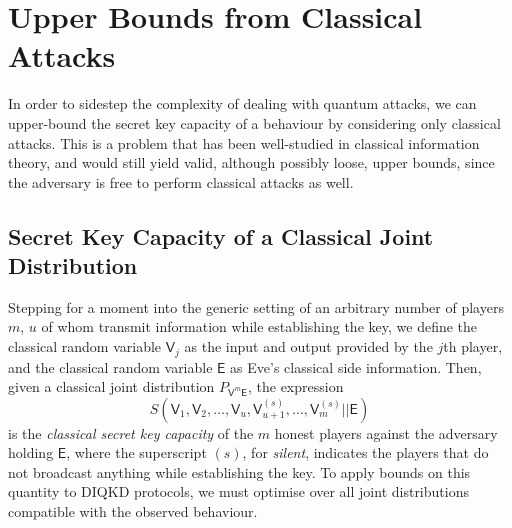 \documentclass[10pt, a4paper]{article}
\numberwithin{equation}{section} %
\theoremstyle{definition}
\theoremstyle{plain}
\newcommand{\?}{\mathrel{?}} %
\newcommand{\cvec}[1]{\boldsymbol{\mathbf{#1}}}    %
\newcommand{\crv}[1]{\mathsf{#1}}
\begin{document}
    \section{Upper Bounds from Classical Attacks}

    In order to sidestep the complexity of dealing with quantum attacks, we can upper-bound the secret key capacity of a behaviour by considering only classical attacks. This is a problem that has been well-studied in classical information theory, and would still yield valid, although possibly loose, upper bounds, since the adversary is free to perform classical attacks as well.

    \subsection{Secret Key Capacity of a Classical Joint Distribution}

    Stepping for a moment into the generic setting of an arbitrary number of players \(m\), \(u\) of whom transmit information while establishing the key, we define the classical random variable \(\crv{V}_j\) as the input and output provided by the \(j\)th player, and the classical random variable \(\crv{E}\) as Eve's classical side information. Then, given a classical joint distribution \(P_{\cvec{\crv{V}}^m\crv{E}}\), the expression
    \begin{equation}
      S(\crv{V}_1, \crv{V}_2, \ldots, \crv{V}_{u}, \crv{V}_{u+1}^{(s)}, \ldots, \crv{V}_{m}^{(s)} || \crv{E})
    \end{equation}
    is the \emph{classical secret key capacity} of the \(m\) honest players against the adversary holding \(\crv{E}\), where the superscript \((s)\), for \emph{silent}, indicates the players that do not broadcast anything while establishing the key. To apply bounds on this quantity to DIQKD protocols, we must optimise over all joint distributions compatible with the observed behaviour.


    \newcommand{\splitkey}[3][\crv{J}]{I_{#1}\left(#2||#3\right)}
\end{document}
